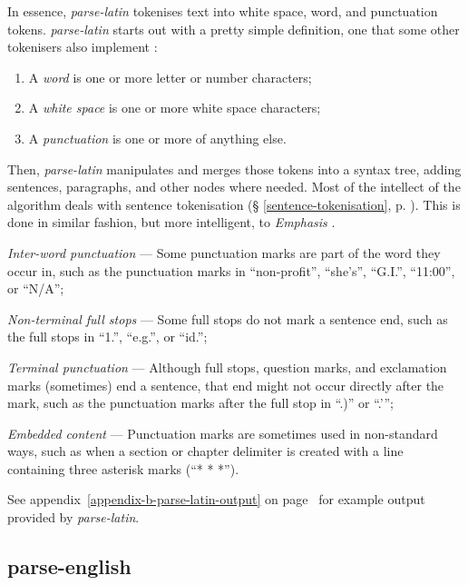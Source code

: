 In essence, \emph{parse-latin} tokenises text into white space, word, and
  punctuation tokens.
\emph{parse-latin} starts out with a pretty simple definition, one that
  some other tokenisers also implement \autocite{treebank-tokenisation}:

\begin{enumerate}
\item A \emph{word} is one or more letter or number characters;
\item A \emph{white space} is one or more white space characters;
\item A \emph{punctuation} is one or more of anything else.
\end{enumerate}

\noindent Then, \emph{parse-latin} manipulates and merges those tokens into a
  syntax tree, adding sentences, paragraphs, and other nodes where needed.
Most of the intellect of the algorithm deals with sentence tokenisation
  (§ \ref{sentence-tokenisation}, p. \pageref{sentence-tokenisation}).
This is done in similar fashion, but more intelligent, to \emph{Emphasis}
  \autocite{nytimes/emphasis-source-code}.

\begin{aenumerate}
\item\emph{Inter-word punctuation} --- Some punctuation marks are part of
  the word they occur in, such as the punctuation marks in ``non-profit'',
  ``she's'', ``G.I.'', ``11:00'', or ``N\slash A'';
\item\emph{Non-terminal full stops} --- Some full stops do not mark a
  sentence end, such as the full stops in ``1.'', ``e.g.'', or ``id.'';
\item\emph{Terminal punctuation} --- Although full stops, question marks,
  and exclamation marks (sometimes) end a sentence, that end might not occur
  directly after the mark, such as the punctuation marks after the full
  stop in ``.)'' or ``.'{}'';
\item\emph{Embedded content} --- Punctuation marks are sometimes used in
  non-standard ways, such as when a section or chapter delimiter is
  created with a line containing three asterisk marks (``* * *'').
\end{aenumerate}

\noindent See appendix~\ref{appendix-b-parse-latin-output} on
page~\pageref{appendix-b-parse-latin-output} for example output provided
by \emph{parse-latin}.

\subsection{parse-english}\label{parse-english}

